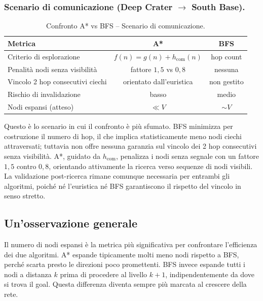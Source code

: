 \documentclass[11pt,a4paper]{article}
\begin{document}
\subsubsection{Scenario di comunicazione (Deep Crater $\to$ South Base).}

\begin{table}[h]
\centering
\caption{Confronto A* vs BFS -- Scenario di comunicazione.}
\small
\begin{tabular}{@{}lcc@{}}
\toprule
\textbf{Metrica} & \textbf{A*} & \textbf{BFS} \\
\midrule
Criterio di esplorazione              & $f(n) = g(n) + h_{\text{com}}(n)$ & hop count \\
Penalità nodi senza visibilità        & fattore $1{,}5$ vs $0{,}8$        & nessuna   \\
Vincolo 2 hop consecutivi ciechi      & orientato dall'euristica           & non gestito \\
Rischio di invalidazione              & basso                              & medio     \\
Nodi espansi (atteso)                 & $\ll V$                            & $\sim V$  \\
\bottomrule
\end{tabular}
\end{table}

Questo è lo scenario in cui il confronto è più sfumato. BFS minimizza per costruzione
il numero di hop, il che implica statisticamente meno nodi ciechi attraversati; tuttavia
non offre nessuna garanzia sul vincolo dei 2 hop consecutivi senza visibilità. A*, guidato
da $h_{\text{com}}$, penalizza i nodi senza segnale con un fattore $1{,}5$ contro $0{,}8$,
orientando attivamente la ricerca verso sequenze di nodi visibili. La validazione
post-ricerca rimane comunque necessaria per entrambi gli algoritmi, poiché né l'euristica
né BFS garantiscono il rispetto del vincolo in senso stretto.
\subsection{Un'osservazione generale}

Il numero di nodi espansi è la metrica più significativa per confrontare l'efficienza dei due algoritmi. A* espande tipicamente molti meno nodi rispetto a BFS, perché scarta presto le direzioni poco promettenti. BFS invece espande tutti i nodi a distanza $k$ prima di procedere al livello $k+1$, indipendentemente da dove si trova il goal. Questa differenza diventa sempre più marcata al crescere della rete.
\end{document}
